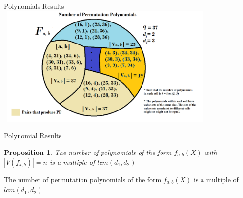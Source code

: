 \documentclass{beamer}
\newtheorem{proposition}{Proposition}
\begin{document}
\begin{frame}{Polynomials Results}
  \includegraphics[width=11cm, height=6cm]{clases}
\end{frame}

\begin{frame}{Polynomial Results}
    \begin{proposition}
    The number of polynomials of the form $f_{a, b}(X)$ with $|V(f_{a, b})| = n$ is a multiple of $lcm(d_1, d_2)$
  \end{proposition}

  \begin{corollary}
    The number of permutation polynomials of the form $f_{a, b}(X)$ is a multiple of $lcm(d_1, d_2)$
  \end{corollary}
\end{frame}



    

\end{document}
